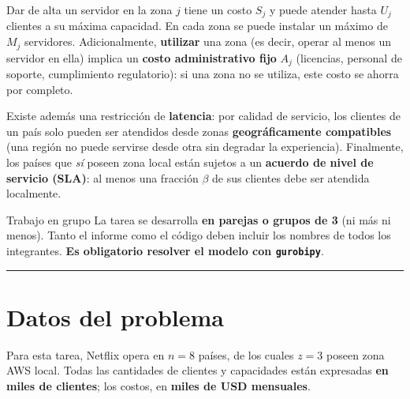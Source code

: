 \documentclass[12pt,a4paper]{article}
\begin{document}
Dar de alta un servidor en la zona $j$ tiene un costo $S_j$ y puede atender
hasta $U_j$ clientes a su máxima capacidad. En cada zona se puede instalar un
máximo de $M_j$ servidores. Adicionalmente, \textbf{utilizar} una zona (es
decir, operar al menos un servidor en ella) implica un \textbf{costo
administrativo fijo} $A_j$ (licencias, personal de soporte, cumplimiento
regulatorio): si una zona no se utiliza, este costo se ahorra por completo.

Existe además una restricción de \textbf{latencia}: por calidad de servicio,
los clientes de un país solo pueden ser atendidos desde zonas
\textbf{geográficamente compatibles} (una región no puede servirse desde otra
sin degradar la experiencia). Finalmente, los países que \emph{sí} poseen zona
local están sujetos a un \textbf{acuerdo de nivel de servicio (SLA)}: al menos
una fracción $\beta$ de sus clientes debe ser atendida localmente.

\begin{ayuda}{Trabajo en grupo}
\vspace{2pt}
La tarea se desarrolla \textbf{en parejas o grupos de 3} (ni más ni menos).
Tanto el informe como el código deben incluir los nombres de todos los
integrantes. \textbf{Es obligatorio resolver el modelo con \texttt{gurobipy}}.
\end{ayuda}

\noindent\rule{\linewidth}{0.4pt}

\section*{Datos del problema}

Para esta tarea, Netflix opera en $n = 8$ países, de los cuales $z = 3$ poseen
zona AWS local. Todas las cantidades de clientes y capacidades están expresadas
\textbf{en miles de clientes}; los costos, en \textbf{miles de USD mensuales}.
\end{document}
